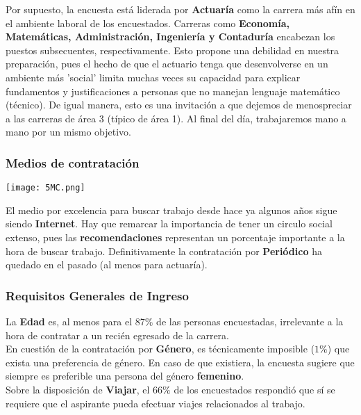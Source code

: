\documentclass{article}
\begin{document}
Por supuesto, la encuesta está liderada por \textbf{Actuaría} como la carrera más afín en el ambiente laboral de los encuestados. Carreras como \textbf{Economía, Matemáticas, Administración, Ingeniería y Contaduría} encabezan los puestos subsecuentes, respectivamente. Esto propone una debilidad en nuestra preparación, pues el hecho de que el actuario tenga que desenvolverse en un ambiente más 'social' limita muchas veces su capacidad para explicar fundamentos y justificaciones a personas que no manejan lenguaje matemático (técnico). De igual manera, esto es una invitación a que dejemos de menospreciar a las carreras de área 3 (típico de área 1). Al final del día, trabajaremos mano a mano por un mismo objetivo. 


\subsubsection{Medios de contratación}

\begin{center}
    \texttt{[image: 5MC.png]}
\end{center}

El medio por excelencia para buscar trabajo desde hace ya algunos años sigue siendo \textbf{Internet}. Hay que remarcar la importancia de tener un circulo social extenso, pues las \textbf{recomendaciones} representan un porcentaje importante a la hora de buscar trabajo. Definitivamente la contratación por \textbf{Periódico} ha quedado en el pasado (al menos para actuaría).

\subsubsection{Requisitos Generales de Ingreso}

La \textbf{Edad} es, al menos para el $87\%$ de las personas encuestadas, irrelevante a la hora de contratar a un recién egresado de la carrera. \\

En cuestión de la contratación por \textbf{Género}, es técnicamente imposible ($1\%$) que exista una preferencia de género. En caso de que existiera, la encuesta sugiere que siempre es preferible una persona del género \textbf{femenino}. \\

Sobre la disposición de \textbf{Viajar}, el $66\%$ de los encuestados respondió que sí se requiere que el aspirante pueda efectuar viajes relacionados al trabajo. 
\end{document}
